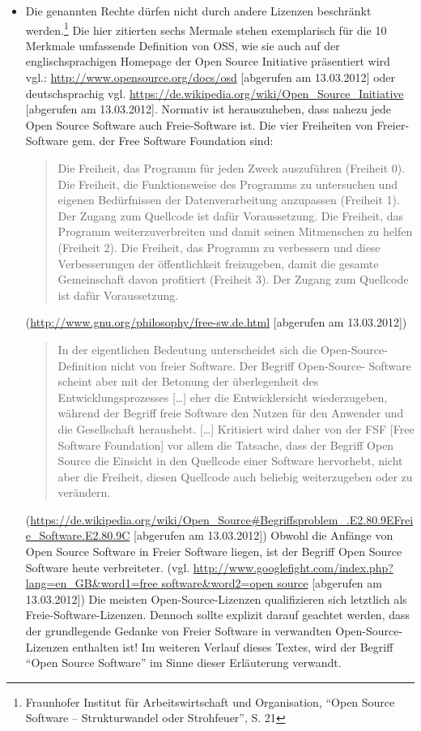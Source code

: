 \documentclass[a4paper]{scrartcl}
\begin{document}
\begin{itemize}
\item Die genannten Rechte dürfen nicht durch andere Lizenzen beschränkt
  werden.\footnote{Fraunhofer Institut für Arbeitswirtschaft und Organisation,
  ``Open Source Software -- Strukturwandel oder Strohfeuer'', S. 21} Die hier
  zitierten sechs Mermale stehen exemplarisch für die 10 Merkmale umfassende
  Definition von OSS, wie sie auch auf der englischsprachigen Homepage der Open
  Source Initiative präsentiert wird vgl.:
  \url{http://www.opensource.org/docs/osd} [abgerufen am 13.03.2012] oder
  deutschsprachig vgl.
  \url{https://de.wikipedia.org/wiki/Open_Source_Initiative} [abgerufen am
  13.03.2012]. Normativ ist herauszuheben, dass nahezu jede Open Source Software
  auch Freie-Software ist. Die vier Freiheiten von Freier-Software gem. der Free
  Software Foundation sind: \begin{quote}Die Freiheit, das Programm für jeden Zweck
    auszuführen (Freiheit 0). Die Freiheit, die Funktionsweise des Programms zu
    untersuchen und eigenen Bedürfnissen der Datenverarbeitung anzupassen
    (Freiheit 1). Der Zugang zum Quellcode ist dafür Voraussetzung. Die
    Freiheit, das Programm weiterzuverbreiten und damit seinen Mitmenschen zu
    helfen (Freiheit 2).  Die Freiheit, das Programm zu verbessern und diese
    Verbesserungen der öffentlichkeit freizugeben, damit die gesamte
    Gemeinschaft davon profitiert (Freiheit 3). Der Zugang zum Quellcode ist
    dafür Voraussetzung.\end{quote}  (\url{http://www.gnu.org/philosophy/free-sw.de.html}
  [abgerufen am 13.03.2012])
\begin{quote}In der eigentlichen Bedeutung unterscheidet
    sich die Open-Source-Definition nicht von freier Software. Der Begriff
    Open-Source- Software scheint aber mit der Betonung der überlegenheit des
    Entwicklungsprozesses [\ldots] eher die Entwicklersicht wiederzugeben,
    während der Begriff freie Software den Nutzen für den Anwender und die
    Gesellschaft heraushebt.  [\ldots] Kritisiert wird daher von der FSF [Free
    Software Foundation] vor allem die Tatsache, dass der Begriff Open Source
    die Einsicht in den Quellcode einer Software hervorhebt, nicht aber die
    Freiheit, diesen Quellcode auch beliebig weiterzugeben oder zu verändern.
\end{quote}(\url{https://de.wikipedia.org/wiki/Open_Source\#Begriffsproblem_.E2.80.9EFreie_Software.E2.80.9C}
  [abgerufen am 13.03.2012]) Obwohl die Anfänge von Open Source
  Software in Freier Software liegen, ist der Begriff Open Source Software heute
  verbreiteter. (vgl.
  \url{http://www.googlefight.com/index.php?lang=en_GB&word1=free software&word2=open source} [abgerufen am 13.03.2012]) Die meisten
  Open-Source-Lizenzen qualifizieren sich letztlich als
  Freie-Software-Lizenzen. Dennoch sollte explizit darauf geachtet werden, dass
  der grundlegende Gedanke von Freier Software in verwandten
  Open-Source-Lizenzen enthalten ist! Im weiteren Verlauf dieses Textes, wird
  der Begriff ``Open Source Software'' im Sinne dieser Erläuterung verwandt.

\end{itemize}
\end{document}
